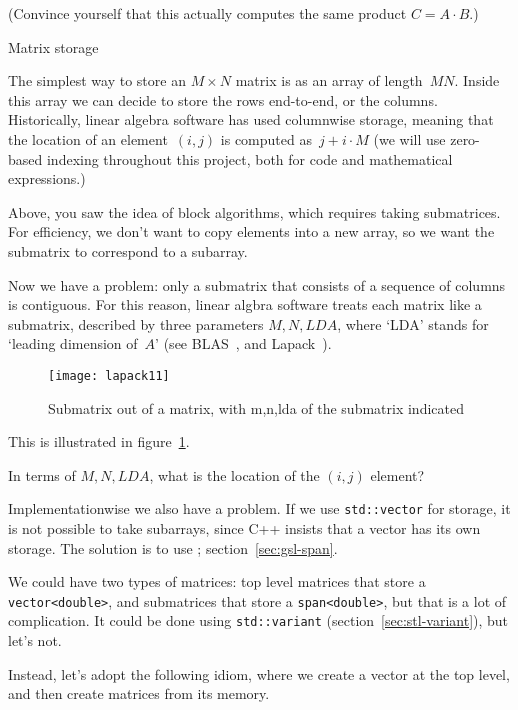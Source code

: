 (Convince yourself that this actually computes the same product
$C=A\cdot B$.)

 {Matrix storage}

The simplest way to store an $M\times N$ matrix is as an array of
length~$MN$. Inside this array we can decide to store the rows
end-to-end, or the columns. Historically, linear algebra software 
has used columnwise storage, meaning that 
the location of an element~$(i,j)$ is computed as~$j+i\cdot M$ (we
will use zero-based indexing throughout this project, both for code
and mathematical expressions.)

Above, you saw the idea of block algorithms, which requires taking
submatrices. For efficiency, we don't want to copy elements into a new
array, so we want the submatrix to correspond to a subarray.

Now we have a problem: only a submatrix that consists of a sequence of
columns is contiguous. For this reason, linear algbra software treats
each matrix like a submatrix, described by three parameters
$M,N,\mathord{LDA}$, where `LDA' stands for `leading dimension
of~$A$' (see \ac{BLAS}~\cite{Lawson:blas}, and Lapack~\cite{WN20}).
%
\begin{figure}[ht]
  \texttt{[image: lapack11]}
  \caption{Submatrix out of a matrix, with m,n,lda of the submatrix
    indicated}
  \label{fig:lapack11}
\end{figure}
%
This is illustrated in figure~\ref{fig:lapack11}.

\begin{exercise}
  In terms of $M,N,\mathord{LDA}$, what is the location of the $(i,j)$
  element?
\end{exercise}

Implementationwise we also have a problem. If we use
\lstinline{std::vector} for storage, it is not possible to take
subarrays, since C++ insists that a vector has its own storage. The
solution is to use ; section~\ref{sec:gsl-span}.

We could have two types of matrices: top level matrices that store a
\lstinline{vector<double>}, and submatrices that store a
\lstinline{span<double>}, but that is a lot of complication.
It could be done using \lstinline{std::variant}
(section~\ref{sec:stl-variant}), but let's not.

Instead,
let's adopt the following idiom, where we create a vector at the top
level, and then create matrices from its memory.
%

